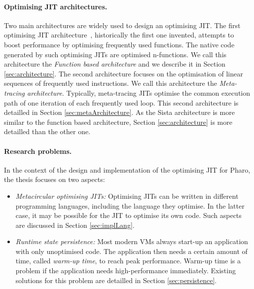 \documentclass[a4paper,12pt,twoside]{../includes/ThesisStyle}
\begin{document}
\paragraph{Optimising JIT architectures.} Two main architectures are widely used to design an optimising JIT. The first optimising JIT architecture~\cite{UrsPHD}, historically the first one invented, attempts to boost performance by optimising frequently used functions. The native code generated by such optimising JITs are optimised n-functions. We call this architecture the \emph{Function based architecture} and we describe it in Section \ref{sec:architecture}. The second architecture focuses on the optimisation of linear sequences of frequently used instructions. We call this architecture the \emph{Meta-tracing architecture}. Typically, meta-tracing JITs optimise the common execution path of one iteration of each frequently used loop. This second architecture is detailled in Section \ref{sec:metaArchitecture}. As the Sista architecture is more similar to the function based architecture, Section \ref{sec:architecture} is more detailled than the other one.

\paragraph{Research problems.} In the context of the design and implementation of the optimising JIT for Pharo, the thesis focuses on 
two
aspects:
\begin{itemize}
	\item \emph{Metacircular optimising JITs: } Optimising JITs can be written in different programming languages, including the language they optimise. In the latter case, it may be possible for the JIT to optimise its own code. Such aspects are discussed in Section \ref{sec:implLang}.
	\item \emph{Runtime state persistence:} Most modern VMs always start-up an application with only unoptimised code. The application then needs a certain amount of time, called \emph{warm-up time}, to reach peak performance. Warm-up time is a problem if the application needs high-performance immediately. Existing solutions for this problem are detailled in Section \ref{sec:persistence}.
\end{itemize}
\end{document}
